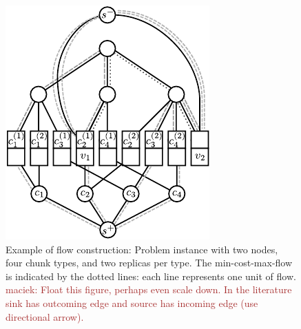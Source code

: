 \documentclass[9pt]{sigcomm-alternate}
\newcommand{\maciek}[1]{\textcolor{brown}{maciek: #1}}
\begin{document}
\begin{figure}
\includegraphics[width=\columnwidth]{figs/flow_ma_cv}
\caption{Example of flow construction: Problem instance with two nodes, four chunk
types, and two replicas per type. The min-cost-max-flow
is indicated by the dotted lines: each line represents one unit of flow.
\maciek{Float this figure, perhaps even scale down. In the literature sink has outcoming edge and source has incoming edge (use directional arrow).}
}
\label{fig:flow_construction}
\end{figure}
\end{document}
